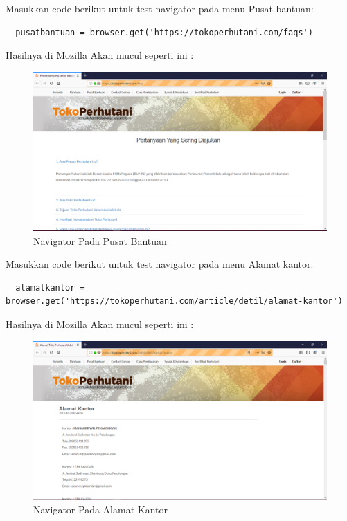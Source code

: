Masukkan code berikut untuk test navigator pada menu  Pusat bantuan:
\begin{verbatim}
  pusatbantuan = browser.get('https://tokoperhutani.com/faqs')
\end{verbatim}

Hasilnya  di Mozilla Akan mucul seperti ini :
\begin{figure}[h]
\centering
\includegraphics[scale=0.3]{figures/2hasil.PNG}
\caption{Navigator Pada Pusat Bantuan}
\end{figure}

Masukkan code berikut untuk test navigator pada menu  Alamat kantor:
\begin{verbatim}
  alamatkantor = browser.get('https://tokoperhutani.com/article/detil/alamat-kantor')
\end{verbatim}

Hasilnya  di Mozilla Akan mucul seperti ini :
\begin{figure}[h]
\centering
\includegraphics[scale=0.3]{figures/3hasil.PNG}
\caption{Navigator Pada Alamat Kantor}
\end{figure}
\\

